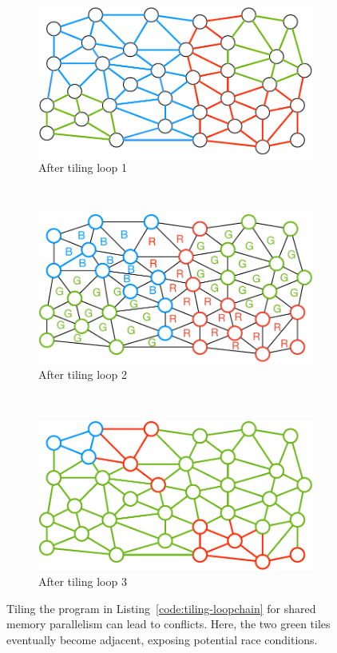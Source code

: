 \begin{figure}[h]
\centering
\begin{subfigure}[b]{0.33\textwidth}
\includegraphics[width=\textwidth]{sparsetiling/figures/loop_0_conflicts.pdf}
\caption{After tiling loop 1}
\label{fig:st-conflicts-a}
\end{subfigure}%
~ 
\begin{subfigure}[b]{0.33\textwidth}
\centering
\includegraphics[width=\textwidth]{sparsetiling/figures/loop_1_conflicts.pdf}
\caption{After tiling loop 2}
\label{fig:st-conflicts-b}
\end{subfigure}%
~
\begin{subfigure}[b]{0.34\textwidth}
\centering
\includegraphics[width=\textwidth]{sparsetiling/figures/loop_2_conflicts.pdf}
\caption{After tiling loop 3}
\label{fig:st-conflicts-c}
\end{subfigure}%

\caption{Tiling the program in Listing~\ref{code:tiling-loopchain} for shared memory parallelism can lead to conflicts. Here, the two green tiles eventually become adjacent, exposing potential race conditions.}
\label{fig:st-conflicts}
\end{figure}

